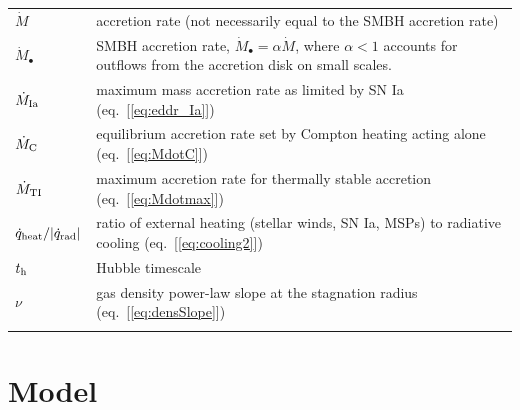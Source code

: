 \documentclass[usenatbib,fleqn]{mn2e}
\begin{document}
\begin{table}
\begin{threeparttable}
\begin{minipage}{18cm}
\begin{tabular}{ll}
  $\dot{M}$ & accretion rate (not necessarily equal to the SMBH accretion rate)   \\
  $\dot{M}_{\bullet}$ & SMBH accretion rate, $\dot{M}_{\bullet} = \alpha\dot{M}$, where $\alpha < 1$ accounts for outflows from the accretion disk on small scales.   \\
  $\dot{M}_{\rm Ia}$ & maximum mass accretion rate as limited by SN Ia (eq.~[\ref{eq:eddr_Ia}]) \\
  $\dot{M}_{\rm C}$ & equilibrium accretion rate set by Compton heating acting alone (eq.~[\ref{eq:MdotC}]) \\
  $\dot{M}_{\rm TI}$ & maximum accretion rate for thermally stable accretion (eq.~[\ref{eq:Mdotmax}]) \\
  $\dot{q}_{\rm heat}/|\dot{q}_{\rm rad}|$ & ratio of external heating (stellar winds, SN Ia, MSPs) to radiative cooling (eq.~[\ref{eq:cooling2}]) \\
  $t_{\rm h}$ & Hubble timescale \\
  $\nu$ & gas density power-law slope at the stagnation radius
  (eq.~[\ref{eq:densSlope}]) \\
  \hline
\label{table:definitions}  
\end{tabular}
\end{minipage}
\end{threeparttable}

\end{table}


\section{Model}
\label{sec:model}
\end{document}
